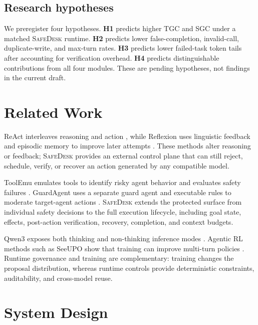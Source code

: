 \documentclass[10pt]{article}
\newcommand{\safedesk}{\textsc{SafeDesk}}
\begin{document}
\subsection{Research hypotheses}

We preregister four hypotheses. \textbf{H1} predicts higher TGC and SGC under a
matched \safedesk{} runtime. \textbf{H2} predicts lower false-completion,
invalid-call, duplicate-write, and max-turn rates. \textbf{H3} predicts lower
failed-task token tails after accounting for verification overhead. \textbf{H4}
predicts distinguishable contributions from all four modules. These are pending
hypotheses, not findings in the current draft.

\section{Related Work}

ReAct interleaves reasoning and action \citep{yao2023react}, while Reflexion uses
linguistic feedback and episodic memory to improve later attempts
\citep{shinn2023reflexion}. These methods alter reasoning or feedback; \safedesk{}
provides an external control plane that can still reject, schedule, verify, or
recover an action generated by any compatible model.

ToolEmu emulates tools to identify risky agent behavior and evaluates safety
failures \citep{ruan2024toolemu}. GuardAgent uses a separate guard agent and
executable rules to moderate target-agent actions \citep{xiang2025guardagent}.
\safedesk{} extends the protected surface from individual safety decisions to the
full execution lifecycle, including goal state, effects, post-action verification,
recovery, completion, and context budgets.

Qwen3 exposes both thinking and non-thinking inference modes
\citep{yang2025qwen3}. Agentic RL methods such as SeeUPO show that training can
improve multi-turn policies \citep{hu2026seeupo}. Runtime governance and training
are complementary: training changes the proposal distribution, whereas runtime
controls provide deterministic constraints, auditability, and cross-model reuse.

\section{System Design}
\end{document}

